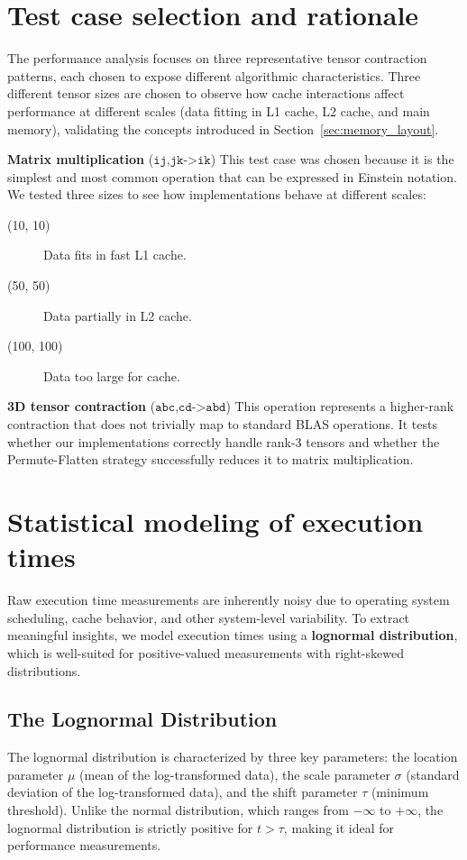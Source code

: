\documentclass[binding=0.6cm]{sapthesis}
\begin{document}
\section{Test case selection and rationale}

The performance analysis focuses on three representative tensor contraction patterns, each chosen to expose different algorithmic characteristics. Three different tensor sizes are chosen to observe how cache interactions affect performance at different scales (data fitting in L1 cache, L2 cache, and main memory), validating the concepts introduced in Section~\ref{sec:memory_layout}.

\textbf{Matrix multiplication} ($\texttt{ij,jk->ik}$) This test case was chosen because it is the simplest and most common operation that can be expressed in Einstein notation. We tested three sizes to see how implementations behave at different scales:
\begin{description}
	\item [(10, 10)] Data fits in fast L1 cache.
	\item [(50, 50)] Data partially in L2 cache.
	\item [(100, 100)] Data too large for cache.
\end{description}

\textbf{3D tensor contraction} ($\texttt{abc,cd->abd}$) This operation represents a higher-rank contraction that does not trivially map to standard BLAS operations. It tests whether our implementations correctly handle rank-3 tensors and whether the Permute-Flatten strategy successfully reduces it to matrix multiplication.

\section{Statistical modeling of execution times}

Raw execution time measurements are inherently noisy due to operating system scheduling, cache behavior, and other system-level variability. To extract meaningful insights, we model execution times using a \textbf{lognormal distribution}, which is well-suited for positive-valued measurements with right-skewed distributions.

\subsection{The Lognormal Distribution}

The lognormal distribution is characterized by three key parameters: the location parameter $\mu$ (mean of the log-transformed data), the scale parameter $\sigma$ (standard deviation of the log-transformed data), and the shift parameter $\tau$ (minimum threshold). Unlike the normal distribution, which ranges from $-\infty$ to $+\infty$, the lognormal distribution is strictly positive for $t > \tau$, making it ideal for performance measurements.
\end{document}
